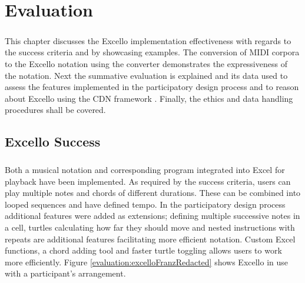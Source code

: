 
\newcommand{\mycbox}[1]{\tikz{\path[draw=#1,fill=#1] (0,0) rectangle (0.3cm,0.3cm);}}

\chapter{Evaluation}

\paragraph{} This chapter discusses the Excello implementation effectiveness with regards to the success criteria and by showcasing examples. The conversion of MIDI corpora to the Excello notation using the converter demonstrates the expressiveness of the notation. Next the summative evaluation is explained and its data used to assess the features implemented in the participatory design process and to reason about Excello using the CDN framework \cite{blackwell:tutorial}. Finally, the ethics and data handling procedures shall be covered.

\section{Excello Success}

\paragraph{} Both a musical notation and corresponding program integrated into Excel for playback have been implemented. As required by the success criteria, users can play multiple notes and chords of different durations. These can be combined into looped sequences and have defined tempo. In the participatory design process additional features were added as extensions; defining multiple successive notes in a cell, turtles calculating how far they should move and nested instructions with repeats are additional features facilitating more efficient notation. Custom Excel functions, a chord adding tool and faster turtle toggling allows users to work more efficiently. Figure \ref{evaluation:excelloFranzRedacted} shows Excello in use with a participant's arrangement.

